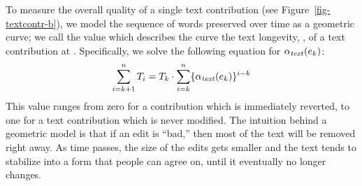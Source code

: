   To measure the overall quality of a single text contribution
  (see Figure~\ref{fig-textcontr-b}), we model the sequence of
  words preserved over time as a geometric curve; we call the
  value which describes the curve
  the text longevity, \tlong, of a text contribution at .
  Specifically, we solve the following equation for $\alpha_\text{\textit{text}}(e_{k})$:
  \begin{equation*}
  	\sum_{i=k+1}^n T_i = T_k \cdot
		\sum_{i=k}^n \{ \alpha_\text{\textit{text}}(e_{k}) \}^{i-k}
  \end{equation*}
  This value ranges from zero for a contribution which is immediately
  reverted, to one for a text contribution which is never modified.
  The intuition behind a geometric model is that if an edit is
  ``bad,'' then most of the text will be removed right away.
  As time passes, the size of the edits gets smaller and
  the text tends to stabilize into a form
  that people can agree on, until it eventually no longer changes.

